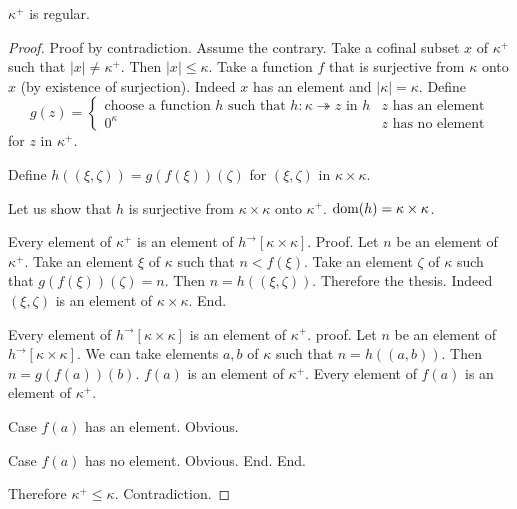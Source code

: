 \documentclass{article}
\newcommand{\Prod}[2]{#1\times #2}
\newcommand{\Succ}[1]{#1^{+}}
\newcommand{\image}[2]{#1^{\to}[#2]}
\newcommand{\card}[1]{\left|#1\right|}
\newcommand{\surjects}{\twoheadrightarrow}
\begin{document}
  \begin{forthel}
    \begin{theorem}[Hausdorff]
      $\Succ{\kappa}$ is regular.
    \end{theorem}
    \begin{proof}
      Proof by contradiction. Assume the contrary.
      Take a cofinal subset $x$ of $\Succ{\kappa}$ such that $\card{x} \neq \Succ{\kappa}$.
      Then $\card{x} \leq \kappa$.
      Take a function $f$ that is surjective from $\kappa$ onto $x$ (by existence of surjection).
      Indeed $x$ has an element and $\card{\kappa} = \kappa$.
      Define
      $$
        g(z) =
          \begin{cases}
            \text{choose a function $h$ such that $h : \kappa \surjects z$ in $h$}
            & \text{$z$ has an element}
            \\
            \text{$0^\kappa$}
            & \text{$z$ has no element}
          \end{cases}
      $$
      for $z$ in $\Succ{\kappa}$.

      Define $h((\xi,\zeta)) = g(f(\xi))(\zeta)$ for $(\xi,\zeta)$ in $\Prod{\kappa}{\kappa}$.

      Let us show that $h$ is surjective from $\Prod{\kappa}{\kappa}$ onto $\Succ{\kappa}$.
      $\dom(h) = \Prod{\kappa}{\kappa}$.

        Every element of $\Succ{\kappa}$ is an element of $\image{h}{\Prod{\kappa}{\kappa}}$.
        Proof.
          Let $n$ be an element of $\Succ{\kappa}$.
          Take an element $\xi$ of $\kappa$ such that $n < f(\xi)$.
          Take an element $\zeta$ of $\kappa$ such that $g(f(\xi))(\zeta) = n$.
          Then $n = h((\xi,\zeta))$.
          Therefore the thesis.
          Indeed $(\xi,\zeta)$ is an element of $\Prod{\kappa}{\kappa}$.
        End.

        Every element of $\image{h}{\Prod{\kappa}{\kappa}}$ is an element of $\Succ{\kappa}$.
        proof.
          Let $n$ be an element of $\image{h}{\Prod{\kappa}{\kappa}}$.
          We can take elements $a,b$ of $\kappa$ such that $n = h((a,b))$.
          Then $n = g(f(a))(b)$.
          $f(a)$ is an element of $\Succ{\kappa}$.
          Every element of $f(a)$ is an element of $\Succ{\kappa}$.

          Case $f(a)$ has an element. Obvious.

          Case $f(a)$ has no element. Obvious.
        End.
      End.

      Therefore $\Succ{\kappa} \leq \kappa$. Contradiction.
    \end{proof}
  \end{forthel}
\end{document}
